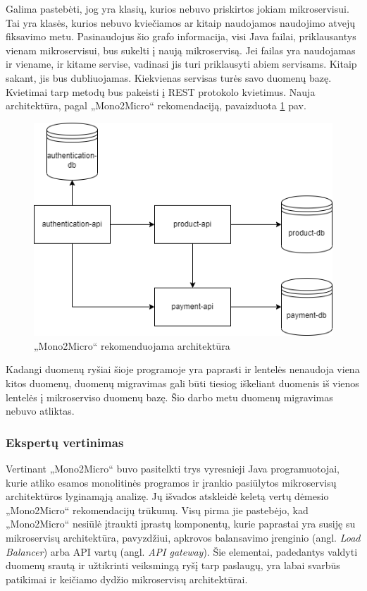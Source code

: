 \documentclass{VUMIFPSbakalaurinis}
\begin{document}
Galima pastebėti, jog yra klasių, kurios nebuvo priskirtos jokiam mikroservisui. Tai yra klasės, kurios nebuvo kviečiamos ar kitaip naudojamos naudojimo atvejų fiksavimo metu. Pasinaudojus šio grafo informacija, visi Java failai, priklausantys vienam mikroservisui, bus sukelti į naują mikroservisą. Jei failas yra naudojamas ir viename, ir kitame servise, vadinasi jis turi priklausyti abiem servisams. Kitaip sakant, jis bus dubliuojamas. Kiekvienas servisas turės savo duomenų bazę. Kvietimai tarp metodų bus pakeisti į REST protokolo kvietimus. Nauja architektūra, pagal „Mono2Micro“ rekomendaciją, pavaizduota \ref{img:nauja-architektura} pav. 

\begin{figure}[H]
    \centering
    \includegraphics[scale=0.6]{img/microservices-new.png}
    \caption{„Mono2Micro“ rekomenduojama architektūra}
    \label{img:nauja-architektura}
\end{figure}

Kadangi duomenų ryšiai šioje programoje yra paprasti ir lentelės nenaudoja viena kitos duomenų, duomenų migravimas gali būti tiesiog iškeliant duomenis iš vienos lentelės į mikroserviso duomenų bazę. Šio darbo metu duomenų migravimas nebuvo atliktas.

\subsubsection{Ekspertų vertinimas}
Vertinant „Mono2Micro“ buvo pasitelkti trys vyresnieji Java programuotojai, kurie atliko esamos monolitinės programos ir įrankio pasiūlytos mikroservisų architektūros lyginamąją analizę. Jų išvados atskleidė keletą vertų dėmesio „Mono2Micro“ rekomendacijų trūkumų. Visų pirma jie pastebėjo, kad „Mono2Micro“ nesiūlė įtraukti įprastų komponentų, kurie paprastai yra susiję su mikroservisų architektūra, pavyzdžiui, apkrovos balansavimo įrenginio (angl. \emph{Load Balancer}) arba API vartų (angl. \emph{API gateway}). Šie elementai, padedantys valdyti duomenų srautą ir užtikrinti veiksmingą ryšį tarp paslaugų, yra labai svarbūs patikimai ir keičiamo dydžio mikroservisų architektūrai.
\end{document}
